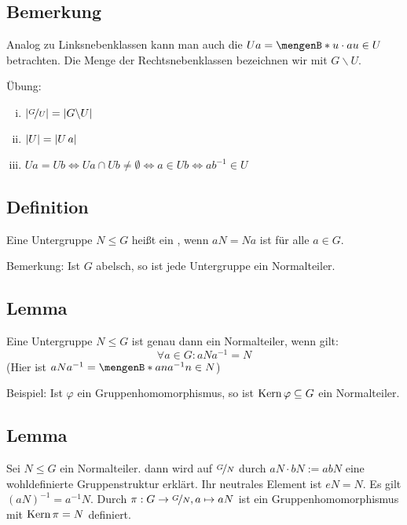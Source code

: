 \subsection[Bemerkung zu Rechtsnebenklassen]{Bemerkung} %
\label{sub:119}
Analog zu Linksnebenklassen kann man auch die  $U a = \set[u \cdot  a]{u \in U} $ betrachten. Die Menge der Rechtsnebenklassen bezeichnen wir mit $G \backslash U$.

Übung: 
\begin{enumerate}[(i)]
	\item $\abs*{\nicefrac{G}{U}} = \abs*{G \backslash U}  $
	\item $\abs*{U} = \abs*{U \,a}  $
	\item $U a = U b \Leftrightarrow U a \cap U b \not= \emptyset \Leftrightarrow a \in U b \Leftrightarrow a b ^{-1} \in U$
\end{enumerate} 

\subsection[Definition: Normalteiler]{Definition} %
\label{sub:120}
Eine Untergruppe $N \le G$ heißt ein , wenn $a N = N a$ ist für alle $a \in G$. 

Bemerkung: Ist $G$ abelsch, so ist jede Untergruppe ein Normalteiler.

\subsection[Lemma: Kriterium für Normalteiler]{Lemma} %
\label{sub:121}
Eine Untergruppe $N \le G$ ist genau dann ein Normalteiler, wenn gilt:
\[
	\forall a \in G : a N a ^{-1} = N
\]
(Hier ist $a N a ^{-1} = \set[a n a ^{-1}]{n \in N} $)

Beispiel: Ist $\varphi$ ein Gruppenhomomorphismus, so ist $\Kern \varphi \subseteq G$ ein Normalteiler.

\subsection[Lemma: Für einen Normalteiler $N$ hat $\nicefrac{G}{N}$ Gruppenstruktur]{Lemma} %
\label{sub:122}
Sei $N \le G$ ein Normalteiler. dann wird auf $\nicefrac{G}{N}$ durch $aN \cdot bN := abN$ eine wohldefinierte Gruppenstruktur erklärt. Ihr neutrales Element ist $eN=N$.
Es gilt $(aN)^{-1} = a ^{-1}N$. Durch $\pi : G \to \nicefrac{G}{N}, a \mapsto aN$ ist ein Gruppenhomomorphismus mit $\Kern \pi = N$ definiert.

